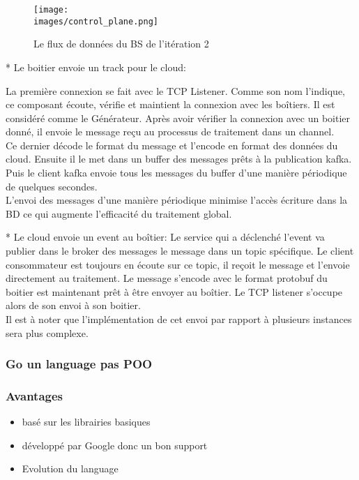              \begin{figure}[ht]
                \centering
                \texttt{[image: \\images/control\_plane.png]}
                \caption{Le flux de données du BS de l'itération 2}
                \label{Figure }
            \end{figure}


            * Le boitier envoie un track pour le cloud: 


            La première connexion se fait avec le TCP Listener. 
            Comme son nom l’indique, ce composant écoute, vérifie et  maintient la 
            connexion avec les boîtiers. Il est considéré comme le Générateur. 
            Après avoir vérifier la connexion avec un boitier donné, il envoie le 
            message reçu au processus de traitement dans un channel. \\
            Ce dernier décode le format du message et l’encode en format des données du 
            cloud. Ensuite il le met dans un buffer des messages prêts à la publication 
            kafka. Puis le client kafka envoie tous les messages du buffer d’une manière 
            périodique de quelques secondes.\\ 
            L’envoi des messages d’une manière périodique minimise l'accès 
            écriture dans la BD ce qui augmente l’efficacité du traitement global. 

            *  Le cloud envoie un event au boîtier: 
            Le service qui a déclenché l’event va publier dans le broker des messages le 
            message dans un topic spécifique. Le client consommateur est toujours en écoute sur ce topic, 
            il reçoit le message et l'envoie directement au traitement. Le message s’encode avec le format 
            protobuf du boitier est maintenant prêt à être envoyer au boîtier. Le TCP listener s’occupe alors 
            de son envoi à son boitier. \\
            Il est à noter que l'implémentation de cet envoi par rapport à plusieurs 
            instances sera plus complexe. 

        
       

        \subsubsection{Go un language pas POO}
       
       

        \subsubsection{Avantages}
            \begin{itemize}
                \renewcommand{\labelitemi}{$\bullet$}
                \item basé sur les librairies basiques
                \item développé par Google donc un bon support 
                \item Evolution du language
            \end{itemize}

